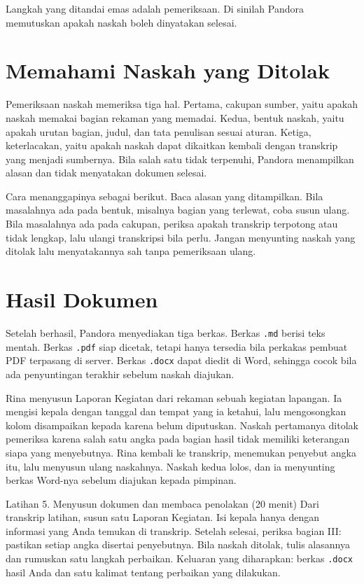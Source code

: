 Langkah yang ditandai emas adalah pemeriksaan. Di sinilah Pandora memutuskan apakah naskah boleh dinyatakan selesai.

\section{Memahami Naskah yang Ditolak}
Pemeriksaan naskah memeriksa tiga hal. Pertama, cakupan sumber, yaitu apakah naskah memakai bagian rekaman yang memadai. Kedua, bentuk naskah, yaitu apakah urutan bagian, judul, dan tata penulisan sesuai aturan. Ketiga, keterlacakan, yaitu apakah naskah dapat dikaitkan kembali dengan transkrip yang menjadi sumbernya. Bila salah satu tidak terpenuhi, Pandora menampilkan alasan dan tidak menyatakan dokumen selesai.

Cara menanggapinya sebagai berikut. Baca alasan yang ditampilkan. Bila masalahnya ada pada bentuk, misalnya bagian yang terlewat, coba susun ulang. Bila masalahnya ada pada cakupan, periksa apakah transkrip terpotong atau tidak lengkap, lalu ulangi transkripsi bila perlu. Jangan menyunting naskah yang ditolak lalu menyatakannya sah tanpa pemeriksaan ulang.

\section{Hasil Dokumen}
Setelah berhasil, Pandora menyediakan tiga berkas. Berkas \texttt{.md} berisi teks mentah. Berkas \texttt{.pdf} siap dicetak, tetapi hanya tersedia bila perkakas pembuat PDF terpasang di server. Berkas \texttt{.docx} dapat diedit di Word, sehingga cocok bila ada penyuntingan terakhir sebelum naskah diajukan.

\begin{ilustrasi}
Rina menyusun Laporan Kegiatan dari rekaman sebuah kegiatan lapangan. Ia mengisi kepala dengan tanggal dan tempat yang ia ketahui, lalu mengosongkan kolom disampaikan kepada karena belum diputuskan. Naskah pertamanya ditolak pemeriksa karena salah satu angka pada bagian hasil tidak memiliki keterangan siapa yang menyebutnya. Rina kembali ke transkrip, menemukan penyebut angka itu, lalu menyusun ulang naskahnya. Naskah kedua lolos, dan ia menyunting berkas Word-nya sebelum diajukan kepada pimpinan.
\end{ilustrasi}

\begin{kegiatan}{Latihan 5. Menyusun dokumen dan membaca penolakan (20 menit)}
Dari transkrip latihan, susun satu Laporan Kegiatan. Isi kepala hanya dengan informasi yang Anda temukan di transkrip. Setelah selesai, periksa bagian III: pastikan setiap angka disertai penyebutnya. Bila naskah ditolak, tulis alasannya dan rumuskan satu langkah perbaikan. Keluaran yang diharapkan: berkas \texttt{.docx} hasil Anda dan satu kalimat tentang perbaikan yang dilakukan.
\end{kegiatan}


